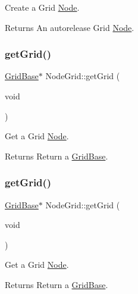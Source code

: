 Create a Grid \hyperlink{classNode}{Node}.

\begin{DoxyReturn}{Returns}
An autorelease Grid \hyperlink{classNode}{Node}. 
\end{DoxyReturn}
\mbox{\label{classNodeGrid_a44d54b145cd25f9a61da77e607ab3baa}} 
\subsubsection{\texorpdfstring{get\+Grid()}{getGrid()}\hspace{0.1cm}{\footnotesize\ttfamily [1/4]}}
{\footnotesize\ttfamily \hyperlink{classGridBase}{Grid\+Base}$\ast$ Node\+Grid\+::get\+Grid (\begin{DoxyParamCaption}\item[{void}]{ }\end{DoxyParamCaption})\hspace{0.3cm}{\ttfamily [inline]}}

Get a Grid \hyperlink{classNode}{Node}.

\begin{DoxyReturn}{Returns}
Return a \hyperlink{classGridBase}{Grid\+Base}. 
\end{DoxyReturn}
\mbox{\label{classNodeGrid_a44d54b145cd25f9a61da77e607ab3baa}} 
\subsubsection{\texorpdfstring{get\+Grid()}{getGrid()}\hspace{0.1cm}{\footnotesize\ttfamily [2/4]}}
{\footnotesize\ttfamily \hyperlink{classGridBase}{Grid\+Base}$\ast$ Node\+Grid\+::get\+Grid (\begin{DoxyParamCaption}\item[{void}]{ }\end{DoxyParamCaption})\hspace{0.3cm}{\ttfamily [inline]}}

Get a Grid \hyperlink{classNode}{Node}.

\begin{DoxyReturn}{Returns}
Return a \hyperlink{classGridBase}{Grid\+Base}. 
\end{DoxyReturn}
\mbox{\label{classNodeGrid_aade5c184216fac8f3651bb0b84bbab17}} 
